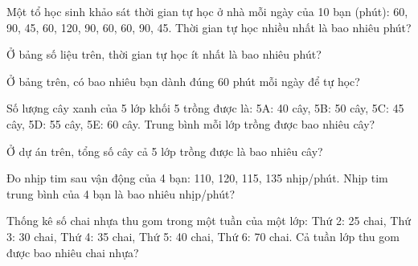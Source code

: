 
\begin{ex}
  Một tổ học sinh khảo sát thời gian tự học ở nhà mỗi ngày của 10 bạn (phút): 60, 90, 45, 60, 120, 90, 60, 60, 90, 45. Thời gian tự học nhiều nhất là bao nhiêu phút?
\end{ex}

\begin{ex}
  Ở bảng số liệu trên, thời gian tự học ít nhất là bao nhiêu phút?
\end{ex}

\begin{ex}
  Ở bảng trên, có bao nhiêu bạn dành đúng 60 phút mỗi ngày để tự học?
\end{ex}

\begin{ex}
  Số lượng cây xanh của 5 lớp khối 5 trồng được là: 5A: 40 cây, 5B: 50 cây, 5C: 45 cây, 5D: 55 cây, 5E: 60 cây. Trung bình mỗi lớp trồng được bao nhiêu cây?
\end{ex}

\begin{ex}
  Ở dự án trên, tổng số cây cả 5 lớp trồng được là bao nhiêu cây?
\end{ex}

\begin{ex}
  Đo nhịp tim sau vận động của 4 bạn: 110, 120, 115, 135 nhịp/phút. Nhịp tim trung bình của 4 bạn là bao nhiêu nhịp/phút?
\end{ex}

\begin{ex}
  Thống kê số chai nhựa thu gom trong một tuần của một lớp: Thứ 2: 25 chai, Thứ 3: 30 chai, Thứ 4: 35 chai, Thứ 5: 40 chai, Thứ 6: 70 chai. Cả tuần lớp thu gom được bao nhiêu chai nhựa?
\end{ex}

